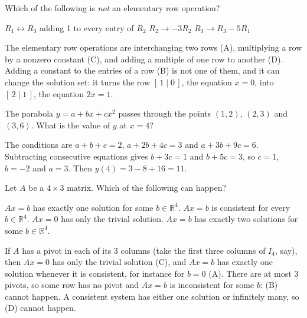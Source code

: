 \begin{question}[id=sys-13]
Which of the following is \emph{not} an elementary row operation?
\begin{options}
  \option $R_1 \leftrightarrow R_3$
  \correct adding 1 to every entry of $R_2$
  \option $R_2 \to -3R_2$
  \option $R_3 \to R_3 - 5R_1$
\end{options}
\begin{solution}
The elementary row operations are interchanging two rows (A), multiplying a row by a nonzero constant (C), and adding a multiple of one row to another (D). Adding a constant to the entries of a row (B) is not one of them, and it can change the solution set: it turns the row $[\,1 \mid 0\,]$, the equation $x = 0$, into $[\,2 \mid 1\,]$, the equation $2x = 1$.
\end{solution}
\end{question}

\begin{question}[id=sys-14, marks=2]
The parabola $y = a + bx + cx^2$ passes through the points $(1, 2)$, $(2, 3)$ and $(3, 6)$. What is the value of $y$ at $x = 4$?
\begin{solution}
The conditions are $a + b + c = 2$, $a + 2b + 4c = 3$ and $a + 3b + 9c = 6$. Subtracting consecutive equations gives $b + 3c = 1$ and $b + 5c = 3$, so $c = 1$, $b = -2$ and $a = 3$. Then $y(4) = 3 - 8 + 16 = 11$.
\end{solution}
\end{question}

\begin{question}[id=sys-15, type=msq, marks=2]
Let $A$ be a $4 \times 3$ matrix. Which of the following can happen?
\begin{options}
  \correct $Ax = b$ has exactly one solution for some $b \in \mathbb{R}^4$.
  \option $Ax = b$ is consistent for every $b \in \mathbb{R}^4$.
  \correct $Ax = 0$ has only the trivial solution.
  \option $Ax = b$ has exactly two solutions for some $b \in \mathbb{R}^4$.
\end{options}
\begin{solution}
If $A$ has a pivot in each of its 3 columns (take the first three columns of $I_4$, say), then $Ax = 0$ has only the trivial solution (C), and $Ax = b$ has exactly one solution whenever it is consistent, for instance for $b = 0$ (A). There are at most 3 pivots, so some row has no pivot and $Ax = b$ is inconsistent for some $b$: (B) cannot happen. A consistent system has either one solution or infinitely many, so (D) cannot happen.
\end{solution}
\end{question}

